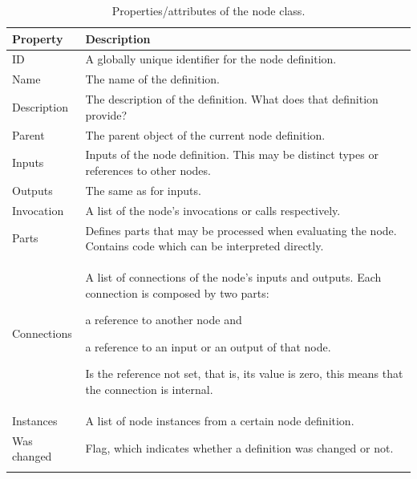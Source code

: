 \documentclass[%
    a4paper,    %
    justified,  %
    nobib,      %
    openany     %
]{tufte-book}
\makeatletter
\renewcommand{\label}[1]{\@tufte@label{##1}}%
\makeatother
\begin{document}
\begin{table}[!htp]
  \begin{tabularx}{\linewidth}{lX}
    \toprule
    \textbf{Property} & \textbf{Description}\\
    \midrule
    ID          & A globally unique identifier for the node definition.          \\
    Name        & The name of the definition.                                    \\
    Description & The description of the definition. What does that definition
                  provide?                                                       \\
    Parent      & The parent object of the current node definition.              \\
    Inputs      & Inputs of the node definition. This may be distinct types or
                  references to other nodes.                                     \\
    Outputs     & The same as for inputs.                                        \\
    Invocation  & A list of the node's invocations or calls respectively.        \\
    Parts       & Defines parts that may be processed when evaluating the node.
                  Contains code which can be interpreted directly.               \\
    Connections & A list of connections of the node's inputs and outputs. Each
                  connection is composed by two parts:
                  \begin{enumerate*}
                    \item a reference to another node and
                    \item a reference to an input or an output of that node.
                  \end{enumerate*}
                  Is the reference not set, that is, its value is zero, this
                  means that the connection is internal.                         \\
    Instances   & A list of node instances from a certain node definition.       \\
    Was changed & Flag, which indicates whether a definition was changed or not. \\
    \bottomrule
  \vspace*{\baselineskip}
  \caption{Properties/attributes of the node class.}
  \label{table:node-properties}
  \end{tabularx}
\end{table}
\end{document}
